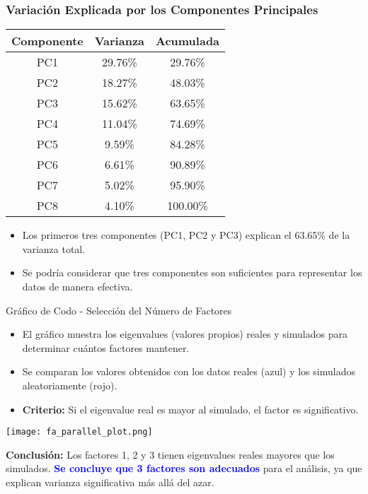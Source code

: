 \documentclass[
	11pt, %
]{beamer}
\begin{document}
\begin{frame}
\frametitle{Variación Explicada por los Componentes Principales}

\begin{table}[ht]
\centering
\scriptsize
\begin{tabular}{|c|c|c|}
\hline
\textbf{Componente} & \textbf{Varianza} & \textbf{Acumulada} \\ \hline
PC1 & 29.76\% & 29.76\% \\ \hline
PC2 & 18.27\% & 48.03\% \\ \hline
PC3 & 15.62\% & 63.65\% \\ \hline
PC4 & 11.04\% & 74.69\% \\ \hline
PC5 & 9.59\% & 84.28\% \\ \hline
PC6 & 6.61\% & 90.89\% \\ \hline
PC7 & 5.02\% & 95.90\% \\ \hline
PC8 & 4.10\% & 100.00\% \\ \hline
\end{tabular}
\end{table}

\begin{itemize}
    \item Los primeros tres componentes (PC1, PC2 y PC3) explican el 63.65\% de la varianza total.
    \item Se podría considerar que tres componentes son suficientes para representar los datos de manera efectiva.
\end{itemize}

\end{frame}


\begin{frame}{Gráfico de Codo - Selección del Número de Factores}

\begin{itemize}
    \item El gráfico muestra los eigenvalues (valores propios) reales y simulados para determinar cuántos factores mantener.
    \item Se comparan los valores obtenidos con los datos reales (azul) y los simulados aleatoriamente (rojo).
    \item \textbf{Criterio:} Si el eigenvalue real es mayor al simulado, el factor es significativo.
\end{itemize}

\vspace{0.3cm}

\begin{center}
    \texttt{[image: fa\_parallel\_plot.png]}
\end{center}

\vspace{0.2cm}

\textbf{Conclusión:} Los factores 1, 2 y 3 tienen eigenvalues reales mayores que los simulados.  
\textcolor{blue}{\textbf{Se concluye que 3 factores son adecuados}} para el análisis, ya que explican varianza significativa más allá del azar.

\end{frame}
\end{document}
